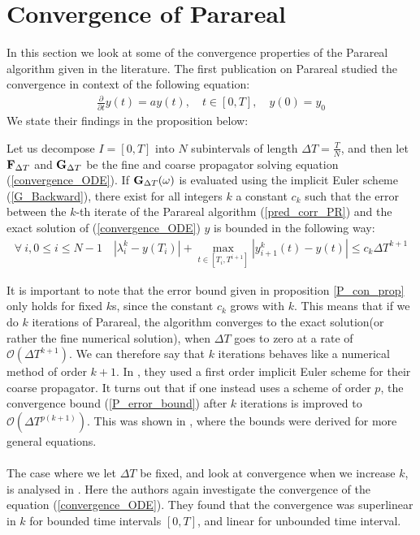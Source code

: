 \section{Convergence of Parareal}
In this section we look at some of the convergence properties of the Parareal algorithm given in the literature. The first publication on Parareal \cite{lions2001resolution} studied the convergence in context of the following equation: 
\begin{align}
\frac{\partial}{\partial t} y(t)=ay(t),\quad t\in [0,T],\quad y(0)=y_0\label{convergence_ODE}
\end{align}
We state their findings in the proposition below:
\begin{proposition} \label{P_con_prop}
Let us decompose $I=[0,T]$ into $N$ subintervals of length $\Delta T = \frac{T}{N}$, and then let $\bold F_{\Delta T}$ and $\bold G_{\Delta T}$ be the fine and coarse propagator solving equation (\ref{convergence_ODE}). If $\bold G_{\Delta T}(\omega)$  is evaluated using the implicit Euler scheme (\ref{G_Backward}), there exist for all integers $k$ a constant $c_k$ such that the error between the $k$-th iterate of the Parareal algorithm (\ref{pred_corr_PR}) and the exact solution of (\ref{convergence_ODE}) $y$ is bounded in the following way:
\begin{align}
\forall \ i,0\leq i\leq N-1 \quad |\lambda_i^k-y(T_i)| + \max_{t\in[T_{i},T^{i+1}]}|y_{i+1}^k(t)-y(t)| \leq c_k\Delta T^{k+1} \label{P_error_bound}
\end{align}
\end{proposition}
\noindent
It is important to note that the error bound given in proposition \ref{P_con_prop} only holds for fixed $k$s, since the constant $c_k$ grows with $k$. This means that if we do $k$ iterations of Parareal, the algorithm converges to the exact solution(or rather the fine numerical solution), when $\Delta T$ goes to zero at a rate of $\mathcal{O}(\Delta T^{k+1})$. We can therefore say that $k$ iterations behaves like a numerical method of order $k+1$. In \cite{lions2001resolution}, they used a first order implicit Euler scheme for their coarse propagator. It turns out that if one instead uses a scheme of order $p$, the convergence bound (\ref{P_error_bound}) after $k$ iterations is improved to $\mathcal{O}(\Delta T^{p(k+1)})$. This was shown in \cite{bal2005convergence}, where the bounds were derived for more general equations. 
\\
\\
The case where we let $\Delta T$ be fixed, and look at convergence when we increase $k$, is analysed in \cite{gander2007analysis}. Here the authors again investigate the convergence of the equation (\ref{convergence_ODE}). They found that the convergence was superlinear in $k$ for bounded time intervals $[0,T]$, and linear for unbounded time interval. 
